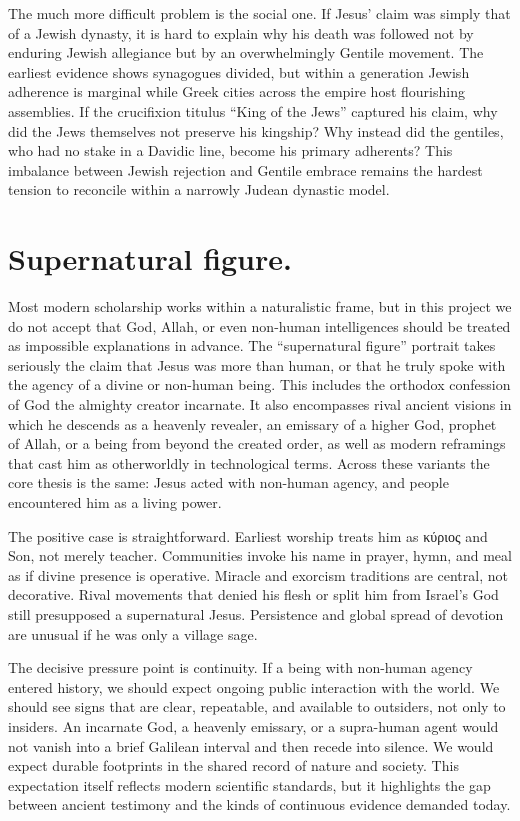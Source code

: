 The much more difficult problem is the social one.
If Jesus’ claim was simply that of a Jewish dynasty, it is hard to explain why his death was followed not by enduring Jewish allegiance but by an overwhelmingly Gentile movement.
The earliest evidence shows synagogues divided, but within a generation Jewish adherence is marginal while Greek cities across the empire host flourishing assemblies.
If the crucifixion titulus “King of the Jews” captured his claim, why did the Jews themselves not preserve his kingship?
Why instead did the gentiles, who had no stake in a Davidic line, become his primary adherents?
This imbalance between Jewish rejection and Gentile embrace remains the hardest tension to reconcile within a narrowly Judean dynastic model.

\section{Supernatural figure.}\label{sec:supernatural}

Most modern scholarship works within a naturalistic frame, but in this project we do not accept that God, Allah, or even non-human intelligences should be treated as impossible explanations in advance.
The ``supernatural figure'' portrait takes seriously the claim that Jesus was more than human, or that he truly spoke with the agency of a divine or non-human being.
This includes the orthodox confession of God the almighty creator incarnate.
It also encompasses rival ancient visions in which he descends as a heavenly revealer, an emissary of a higher God, prophet of Allah, or a being from beyond the created order, as well as modern reframings that cast him as otherworldly in technological terms.
Across these variants the core thesis is the same: Jesus acted with non-human agency, and people encountered him as a living power.

The positive case is straightforward.
Earliest worship treats him as κύριος and Son, not merely teacher.
Communities invoke his name in prayer, hymn, and meal as if divine presence is operative.
Miracle and exorcism traditions are central, not decorative.
Rival movements that denied his flesh or split him from Israel’s God still presupposed a supernatural Jesus.
Persistence and global spread of devotion are unusual if he was only a village sage.

The decisive pressure point is continuity.
If a being with non-human agency entered history, we should expect ongoing public interaction with the world.
We should see signs that are clear, repeatable, and available to outsiders, not only to insiders.
An incarnate God, a heavenly emissary, or a supra-human agent would not vanish into a brief Galilean interval and then recede into silence.
We would expect durable footprints in the shared record of nature and society.
This expectation itself reflects modern scientific standards, but it highlights the gap between ancient testimony and the kinds of continuous evidence demanded today.

